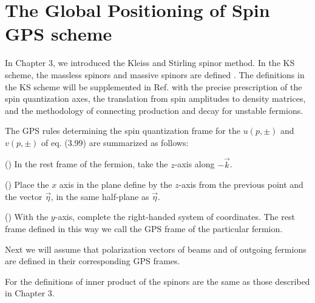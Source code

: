 \chapter{The Global Positioning of Spin GPS scheme}
In Chapter 3, we introduced the Kleiss and Stirling spinor method. In the KS scheme, the massless spinors and massive spinors are defined \cite{KS}. The definitions in the KS scheme will be supplemented in Ref. \cite{GPS} with the precise prescription of the spin quantization axes, the translation from spin amplitudes to density matrices, and the methodology of connecting production and decay for unstable fermions. 

The GPS rules determining the spin quantization frame for the $u(p,\pm)$ and $v(p,\pm)$ of eq. (3.99) are summarized as follows:

() In the rest frame of the fermion, take the $z$-axis along $-\vec{k}$.

() Place the $x$ axis in the plane define by the $z$-axis from the previous point and the vector $\vec{\eta}$, in the same half-plane as $\vec{\eta}$.

() With the $y$-axis, complete the right-handed system of coordinates. The rest frame defined in this way we call the GPS frame of the particular fermion.

Next we will assume that polarization vectors of beams and of outgoing fermions are defined in their corresponding GPS frames.

For the definitions of inner product of the spinors are the same as those described in Chapter 3. 

